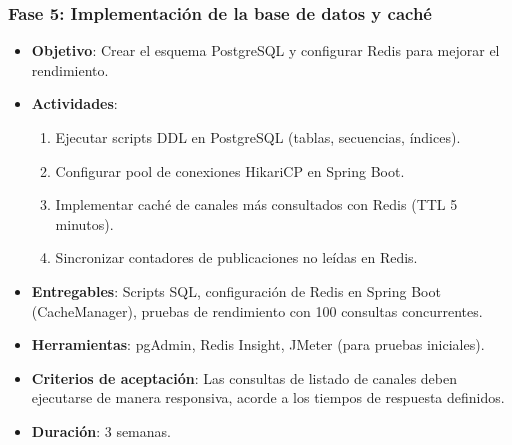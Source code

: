 \subsubsection{Fase 5: Implementación de la base de datos y caché}
\begin{itemize}
    \item \textbf{Objetivo}: Crear el esquema PostgreSQL y configurar Redis para mejorar el rendimiento.
    \item \textbf{Actividades}:
        \begin{enumerate}
            \item Ejecutar scripts DDL en PostgreSQL (tablas, secuencias, índices).
            \item Configurar pool de conexiones HikariCP en Spring Boot.
            \item Implementar caché de canales más consultados con Redis (TTL 5 minutos).
            \item Sincronizar contadores de publicaciones no leídas en Redis.
        \end{enumerate}
    \item \textbf{Entregables}: Scripts SQL, configuración de Redis en Spring Boot (CacheManager), pruebas de rendimiento con 100 consultas concurrentes.
    \item \textbf{Herramientas}: pgAdmin, Redis Insight, JMeter (para pruebas iniciales).
    \item \textbf{Criterios de aceptación}: Las consultas de listado de canales deben ejecutarse de manera responsiva, acorde a los tiempos de respuesta definidos.
    \item \textbf{Duración}: 3 semanas.
\end{itemize}

